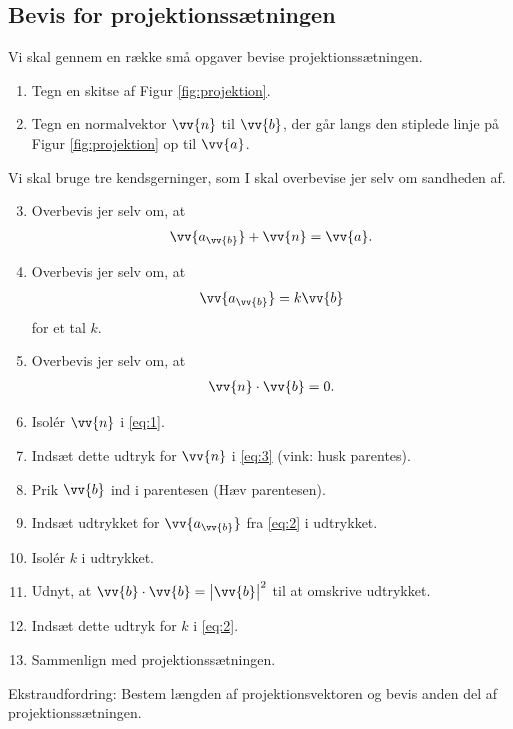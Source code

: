 \subsection*{Bevis for projektionssætningen}
Vi skal gennem en række små opgaver bevise projektionssætningen. 
\begin{enumerate}[label=\roman*)]
	\item Tegn en skitse af Figur \ref{fig:projektion}.
	\item Tegn en normalvektor $\vv{n}$ til $\vv{b}$, der går langs den stiplede linje på Figur \ref{fig:projektion} op til $\vv{a}$.
\end{enumerate}
Vi skal bruge tre kendsgerninger, som I skal overbevise jer selv om sandheden af.
\begin{enumerate}[label=\roman*)]
	\setcounter{enumi}{2}
	\item Overbevis jer selv om, at 
	\begin{align}\label{eq:1}
		\vv{a_{\vv{b}}} + \vv{n} = \vv{a}.
	\end{align}	 
	\item Overbevis jer selv om, at
	\begin{align}\label{eq:2}
		\vv{a_{\vv{b}}} = k \vv{b}
	\end{align}	  
	for et tal $k$. 
	\item Overbevis jer selv om, at
	\begin{align}\label{eq:3}
		\vv{n} \cdot \vv{b} = 0.
	\end{align}	
	\item Isolér $\vv{n}$ i \eqref{eq:1}.
	\item Indsæt dette udtryk for $\vv{n}$ i \eqref{eq:3} (vink: husk parentes).
	\item Prik $\vv{b}$ ind i parentesen (Hæv parentesen). 
	\item Indsæt udtrykket for $\vv{a_{\vv{b}}}$ fra \eqref{eq:2} i udtrykket.
	\item Isolér $k$ i udtrykket. 
	\item Udnyt, at $\vv{b}\cdot\vv{b} = \big|\vv{b}\big|^2$ til at omskrive udtrykket.
	\item Indsæt dette udtryk for $k$ i \eqref{eq:2}.
	\item Sammenlign med projektionssætningen.
\end{enumerate}

Ekstraudfordring: Bestem længden af projektionsvektoren og bevis anden del af projektionssætningen.

\newpage

